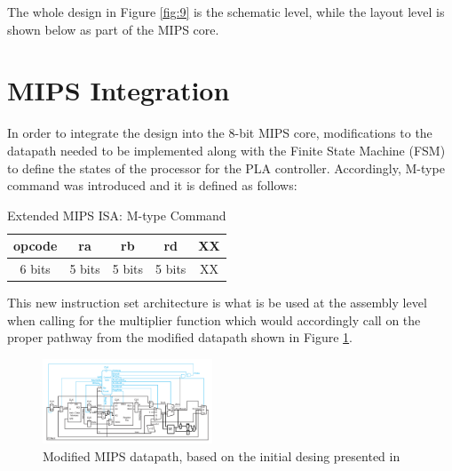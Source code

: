\documentclass[journal]{IEEEtran}
\begin{document}
The whole design in Figure \ref{fig:9} is the schematic level, while the layout level is shown below as part of the MIPS core.


\section{MIPS Integration}

In order to integrate the design into the 8-bit MIPS core, modifications to the datapath needed to be implemented along with the Finite State Machine (FSM) to define the states of the processor for the PLA controller. Accordingly, M-type command was introduced and it is defined as follows:


\begin{table}[!h]
\renewcommand{\arraystretch}{1.5}
\caption{Extended MIPS ISA: M-type Command}
\label{tab:t7}
\centering
\begin{tabular}{|c|c|c|c|c|}
\hline
\textbf{opcode}&\textbf{ra} & \textbf{rb} & \textbf{rd} &\textbf{XX}\\\hline
6 bits & 5 bits & 5 bits & 5 bits & XX\\\hline
\end{tabular}
\end{table}


This new instruction set architecture is what is be used at the assembly level when calling for the multiplier function which would accordingly call on the proper pathway from the modified datapath shown in Figure \ref{fig:10}.

\vspace{-10pt}

\begin{figure}[h!]
  \centering
  \includegraphics[width=0.45\textwidth]{10.png}
  \centering
  \caption{Modified MIPS datapath, based on the initial desing presented in \cite{tb}}
  \label{fig:10}
\end{figure}
\end{document}
